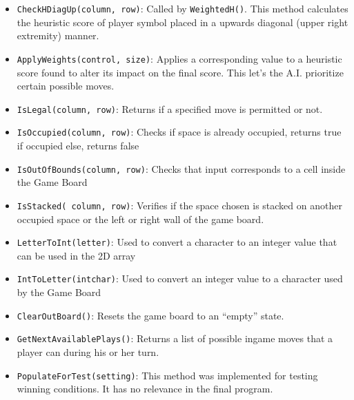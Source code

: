\documentclass[10pt]{article}
\begin{document}
\begin{itemize}
    \item \texttt{CheckHDiagUp(column, row)}: Called by \texttt{WeightedH()}. This method calculates the heuristic score of player symbol placed in a upwards diagonal (upper right extremity) manner.
    \item \texttt{ApplyWeights(control, size)}: Applies a corresponding value to a heuristic score found to alter its impact on the final score. This let’s the A.I. prioritize certain possible moves.
    \item \texttt{IsLegal(column, row)}: Returns if a specified move is permitted or not.
    \item \texttt{IsOccupied(column, row)}: Checks if space is already occupied, returns true if occupied else, returns false
    \item \texttt{IsOutOfBounds(column, row)}: Checks that input corresponds to a cell inside the Game Board
    \item \texttt{IsStacked( column, row)}: Verifies if the space chosen is stacked on another occupied space or the left or right wall of the game board.
    \item \texttt{LetterToInt(letter)}: Used to convert a character to an integer value that can be used in the 2D array
    \item \texttt{IntToLetter(intchar)}: Used to convert an integer value to a character used by the Game Board
    \item \texttt{ClearOutBoard()}: Resets the game board to an “empty” state.
    \item \texttt{GetNextAvailablePlays()}: Returns a list of possible ingame moves that a player can during his or her turn.
    \item \texttt{PopulateForTest(setting)}: This method was implemented for testing winning conditions. It has no relevance in the final program.
\end{itemize}
\end{document}
